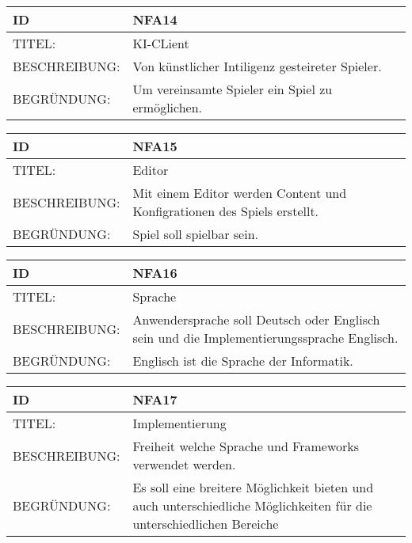 \documentclass{uulm-assignment}
\begin{document}
    \begin{tabularx}{\textwidth}{|l|X |} \hline
        \textbf{ID} & \textbf{NFA14} \\
        \hline
        TITEL: &  KI-CLient\\
        \hline
        BESCHREIBUNG: &  Von künstlicher Intiligenz gesteireter Spieler.\\
        \hline
        BEGRÜNDUNG: &  Um vereinsamte Spieler ein Spiel zu ermöglichen.\\
        \hline
    \end{tabularx}

    \begin{tabularx}{\textwidth}{|l|X |} \hline
        \textbf{ID} & \textbf{NFA15} \\
        \hline
        TITEL: &  Editor\\
        \hline
        BESCHREIBUNG: &  Mit einem Editor werden Content und Konfigrationen des Spiels erstellt.\\
        \hline
        BEGRÜNDUNG: &  Spiel soll spielbar sein.\\
        \hline
    \end{tabularx}

    \begin{tabularx}{\textwidth}{|l|X |} \hline
        \textbf{ID} & \textbf{NFA16} \\
        \hline
        TITEL: &  Sprache\\
        \hline
        BESCHREIBUNG: &  Anwendersprache soll Deutsch oder Englisch sein und die Implementierungssprache Englisch.\\
        \hline
        BEGRÜNDUNG: &  Englisch ist die Sprache der Informatik.\\
        \hline
    \end{tabularx}

    \begin{tabularx}{\textwidth}{|l|X |} \hline
        \textbf{ID} & \textbf{NFA17} \\
        \hline
        TITEL: &  Implementierung\\
        \hline
        BESCHREIBUNG: &  Freiheit welche Sprache und Frameworks verwendet werden. \\
        \hline
        BEGRÜNDUNG: &  Es soll eine breitere Möglichkeit bieten und auch unterschiedliche Möglichkeiten für die unterschiedlichen Bereiche\\
        \hline
    \end{tabularx}
\end{document}
